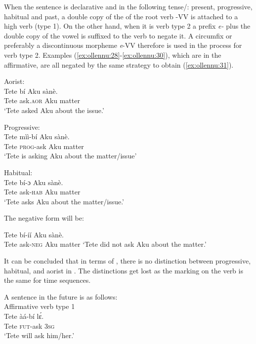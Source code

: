 \documentclass[output=paper,newtxmath,modfonts,nonflat,draftmode]{langsci/langscibook}
\begin{document}
When the sentence is declarative and in the following tense/: present, progressive, habitual and past, a double copy of the  of the root verb -VV is attached to a high  verb (type 1). On the other hand, when it is verb type 2 a prefix \textit{e-} plus the double copy of the vowel is suffixed to the verb to negate it. A circumfix or preferably a discontinuous morpheme \textit{e}-VV therefore is used in the  process for verb type 2. Examples (\ref{ex:ollennu:28}-\ref{ex:ollennu:30}), which are in the affirmative, are all negated by the same strategy to obtain (\ref{ex:ollennu:31}).

\ea \label{ex:ollennu:28} 
Aorist:\\
\gll Tete bí Aku sànè.\\
Tete ask.\textsc{aor} Aku matter\\
\glt `Tete asked Aku about the issue.'
\z

\ea \label{ex:ollennu:29}
Progressive: \\
\gll Tete mìì-bí Aku sànè.\\
Tete \textsc{prog}-ask Aku matter\\
\glt `Tete is asking Aku about the matter/issue'
\z

\ea \label{ex:ollennu:30}
Habitual: \\
\gll Tete bí-ɔ Aku sànè.\\
Tete ask-\textsc{hab} Aku matter\\
\glt`Tete asks Aku about the matter/issue.'
\z

The negative form will be:

\ea \label{ex:ollennu:31}
Tete bí-íí Aku sànè.\\
Tete ask-\textsc{neg} Aku matter
\glt `Tete did not ask Aku about the matter.'
\z

It can be concluded that in terms of , there is no distinction between progressive, habitual, and aorist in . The distinctions get lost as the  marking on the verb is the same for time sequences.

A sentence in the future is as follows:\\


\ea Affirmative verb type 1 \label{ex:ollennu:32}\\
\gll Tete àá-bí l\'ɛ.\\
Tete \textsc{fut}-ask 3\textsc{sg} \\
\glt `Tete will ask him/her.'
\z
\end{document}
